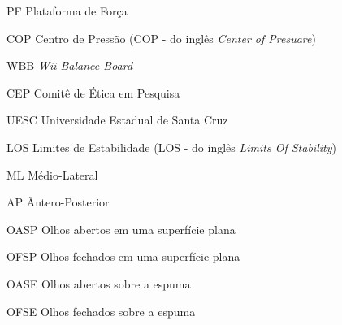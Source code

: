 \begin{siglas}
 
\item[PF] Plataforma de Força 

\item[COP] Centro de Pressão (COP - do inglês \textit{Center of Presuare})

\item[WBB] \textit{Wii Balance Board} 

\item[CEP] Comitê de Ética em Pesquisa 

\item[UESC] Universidade Estadual de Santa Cruz

\item[LOS] Limites de Estabilidade (LOS - do inglês \textit{Limits Of Stability})

\item[ML] Médio-Lateral 

\item[AP] Ântero-Posterior
\item[OASP] Olhos abertos em uma superfície plana 
\item[OFSP] Olhos fechados em uma superfície plana
\item[OASE] Olhos abertos sobre a espuma
\item[OFSE] Olhos fechados sobre a espuma
\end{siglas}





